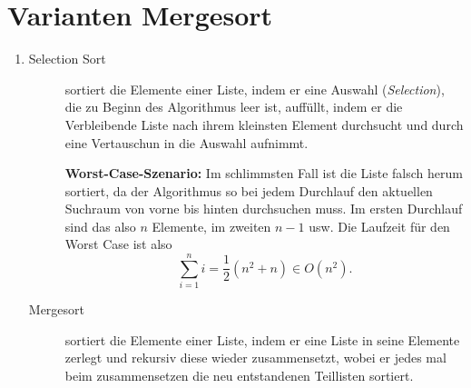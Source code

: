 \documentclass[a4paper,10pt]{scrartcl}
\begin{document}
\section{Varianten Mergesort}
\begin{enumerate}
\item \begin{description}
       \item[Selection Sort] sortiert die Elemente einer Liste, indem er eine
Auswahl (\textit{Selection}), die zu Beginn des Algorithmus leer ist, auff\"ullt,
indem er die Verbleibende Liste nach ihrem kleinsten Element durchsucht und
durch eine Vertauschun in die Auswahl aufnimmt.

\textbf{Worst-Case-Szenario:} Im schlimmsten Fall ist die Liste falsch
herum sortiert, da der Algorithmus so bei jedem Durchlauf den aktuellen
Suchraum von vorne bis hinten durchsuchen muss. Im ersten Durchlauf sind das
also $n$ Elemente, im zweiten $n-1$ usw. Die Laufzeit f\"ur den Worst Case ist
also
\[
 \sum\limits_{i = 1}^{n} i = \frac{1}{2} \left(n^2 + n\right) \in O(n^2).
\]


       \item[Mergesort] sortiert die Elemente einer Liste, indem er eine Liste
in seine Elemente zerlegt und rekursiv diese wieder zusammensetzt, wobei er
jedes mal beim zusammensetzen die neu entstandenen Teillisten sortiert.


\end{description}
\end{enumerate}
\end{document}
